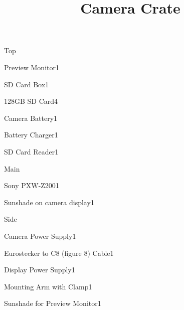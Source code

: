 \def\papersize{5}




\title{Camera Crate}

\begin{checklist}{Top}
  \item{Preview Monitor}{1}
  \item{SD Card Box}{1}
  \item{128GB SD Card}{4}
  \item{Camera Battery}{1}
  \item{Battery Charger}{1}
  \item{SD Card Reader}{1}
\end{checklist}

\begin{checklist}{Main}
  \item{Sony PXW-Z200}{1}
  \item{Sunshade on camera display}{1}
\end{checklist}

\begin{checklist}{Side}
  \item{Camera Power Supply}{1}
  \item{Eurostecker to C8 (figure 8) Cable}{1}
  \item{Display Power Supply}{1}
  \item{Mounting Arm with Clamp}{1}
  \item{Sunshade for Preview Monitor}{1}
\end{checklist}


